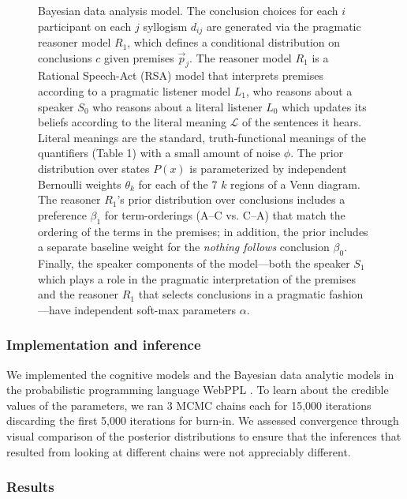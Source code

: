 \documentclass[floatsintext, doc]{apa6}
\begin{document}
\begin{figure}[ht!]
\begin{center}
\begin{tabular}{cc}
    \end{tabular}
  \end{center}
  \caption{\small Bayesian data analysis model. The conclusion choices for each $i$ participant on each $j$ syllogism $d_{ij}$ are generated via the pragmatic reasoner model $R_1$, which defines a conditional distribution on conclusions $c$ given premises $\vec{p}_j$. The reasoner model $R_1$ is a Rational Speech-Act (RSA) model that interprets premises according to a pragmatic listener model $L_1$, who reasons about a speaker $S_0$ who reasons about a literal listener $L_0$ which updates its beliefs according to the literal meaning $\mathcal{L}$ of the sentences it hears. Literal meanings are the standard, truth-functional meanings of the quantifiers (Table 1\label{tab:sem}) with a small amount of noise $\phi$. The prior distribution over states $P(x)$ is parameterized by independent Bernoulli weights $\theta_k$ for each of the 7 $k$ regions of a Venn diagram. The reasoner $R_1$'s prior distribution over conclusions includes a preference $\beta_1$ for term-orderings (A--C vs. C--A) that match the ordering of the terms in the premises; in addition, the prior includes a separate baseline weight for the \emph{nothing follows} conclusion $\beta_0$. Finally, the speaker components of the model---both the speaker $S_1$ which plays a role in the pragmatic interpretation of the premises and the reasoner $R_1$ that selects conclusions in a pragmatic fashion---have independent soft-max parameters $\alpha$.}
  \label{fig:bayesnet}
\end{figure}

\subsubsection{Implementation and inference}

We implemented the cognitive models and the Bayesian data analytic models in the probabilistic programming language WebPPL \cite{dippl}. 
To learn about the credible values of the parameters, we ran 3 MCMC chains each for 15,000 iterations discarding the first 5,000 iterations for burn-in. 
We assessed convergence through visual comparison of the posterior distributions to ensure that the inferences that resulted from looking at different chains were not appreciably different.

\subsubsection{Results}
\end{document}
